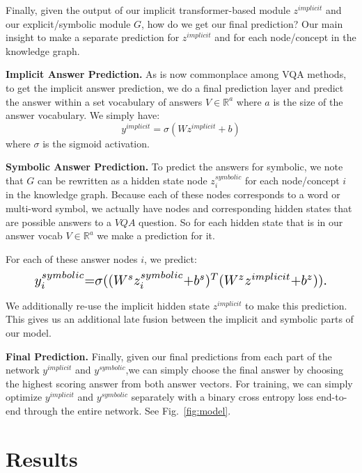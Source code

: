 \documentclass[final]{cvpr}
\providecommand{\myparagraph}[1]{\noindent\textbf{#1.}}
\providecommand{\sectionvspace}{\vspace{-0cm}}
\begin{document}
Finally, given the output of our implicit transformer-based module $z^{implicit}$ and our explicit/symbolic module $G$, how do we get our final prediction? Our main insight to make a separate prediction for $z^{implicit}$ and for each node/concept in the knowledge graph.

\myparagraph{Implicit Answer Prediction}
As is now commonplace among VQA methods, to get the implicit answer prediction, we do a final prediction layer and predict the answer within a set vocabulary of answers $V \in \mathbb{R}^{a}$ where $a$ is the size of the answer vocabulary. We simply have:
\begin{equation}
y^{implicit}{=}\sigma(W z^{implicit}{+}b)
\label{eq:implicit}
\end{equation} 
where $\sigma$ is the sigmoid activation.

\myparagraph{Symbolic Answer Prediction}
To predict the answers for symbolic, we note that $G$ can be rewritten as a hidden state node $z_{i}^{symbolic}$ for each node/concept $i$ in the knowledge graph. Because each of these nodes corresponds to a word or multi-word symbol, we actually have nodes and corresponding hidden states that are possible answers to a $VQA$ question. So for each hidden state that is in our answer vocab $V \in \mathbb{R}^{a}$ we make a prediction for it.

For each of these answer nodes $i$, we predict:
\begin{equation}
\resizebox{0.9\hsize}{!}{
        $y_i^{symbolic}{=}\sigma((W^s z_i^{symbolic}{+}b^s)^T(W^z z^{implicit}{+}b^z)).$      
        }
\vspace{-.05cm}
\label{eq:symbolic}
\end{equation}


We additionally re-use the implicit hidden state $z^{implicit}$ to make this prediction. This gives us an additional late fusion between the implicit and symbolic parts of our model.

\myparagraph{Final Prediction}
Finally, given our final predictions from each part of the network $y^{implicit}$ and $y^{symbolic}$,we  can simply  choose  the  final  answer  by  choosing  the  highest scoring answer from both  answer vectors. For training, we can simply optimize $y^{implicit}$ and $y^{symbolic}$ separately with a binary cross entropy loss end-to-end through the entire network. See Fig.~\ref{fig:model}.

\sectionvspace
\section{Results}
\sectionvspace
\end{document}
